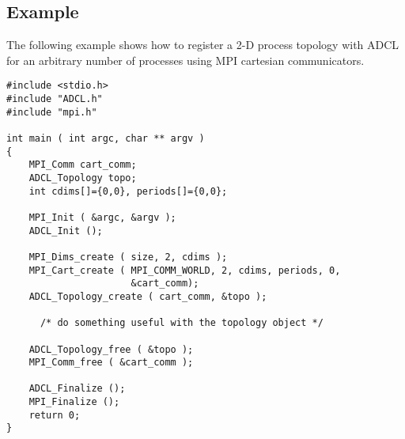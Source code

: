 \subsection{Example}

The following example shows how to register a 2-D process topology with ADCL for an arbitrary number of processes using MPI cartesian communicators.

\begin{verbatim}
#include <stdio.h>
#include "ADCL.h"
#include "mpi.h"

int main ( int argc, char ** argv ) 
{
    MPI_Comm cart_comm;
    ADCL_Topology topo;
    int cdims[]={0,0}, periods[]={0,0};
   
    MPI_Init ( &argc, &argv );
    ADCL_Init ();
	  
    MPI_Dims_create ( size, 2, cdims );
    MPI_Cart_create ( MPI_COMM_WORLD, 2, cdims, periods, 0, 
                      &cart_comm);
    ADCL_Topology_create ( cart_comm, &topo );

 	  /* do something useful with the topology object */

    ADCL_Topology_free ( &topo );
    MPI_Comm_free ( &cart_comm );
    
    ADCL_Finalize ();
    MPI_Finalize ();	  
    return 0;
}
\end{verbatim}
